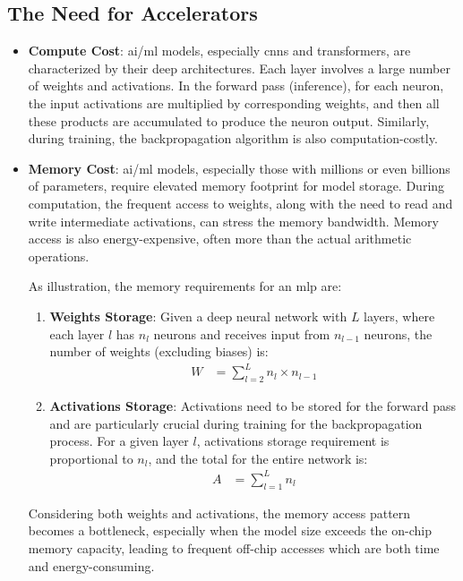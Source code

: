 \subsection{The Need for Accelerators}
\begin{itemize}
	\item \textbf{Compute Cost}: \gls{ai}/\gls{ml} models, especially \glspl{cnn} and transformers, are characterized by their deep architectures. Each layer involves a large number of weights and activations. In the forward pass (inference), for each neuron, the input activations are multiplied by corresponding weights, and then all these products are accumulated to produce the neuron output. Similarly, during training, the backpropagation algorithm is also computation-costly.
	
	\item \textbf{Memory Cost}: \gls{ai}/\gls{ml} models, especially those with millions or even billions of parameters, require elevated memory footprint for model storage. During computation, the frequent access to weights, along with the need to read and write intermediate activations, can stress the memory bandwidth. Memory access is also energy-expensive, often more than the actual arithmetic operations.
	
	As illustration, the memory requirements for an \gls{mlp} are:
	\begin{enumerate}
		\item \textbf{Weights Storage}: Given a deep neural network with \(L\) layers, where each layer \(l\) has \(n_l\) neurons and receives input from \(n_{l-1}\) neurons, the number of weights (excluding biases) is:
		\begin{align*}
		W &= \sum_{l=2}^{L} n_l \times n_{l-1}
		\end{align*}
		
		\item \textbf{Activations Storage}: Activations need to be stored for the forward pass and are particularly crucial during training for the backpropagation process. For a given layer \(l\), activations storage requirement is proportional to \(n_l\), and the total for the entire network is:
		\begin{align*}
		A &= \sum_{l=1}^{L} n_l
		\end{align*}
	\end{enumerate}
	Considering both weights and activations, the memory access pattern becomes a bottleneck, especially when the model size exceeds the on-chip memory capacity, leading to frequent off-chip accesses which are both time and energy-consuming.
	

\end{itemize}
